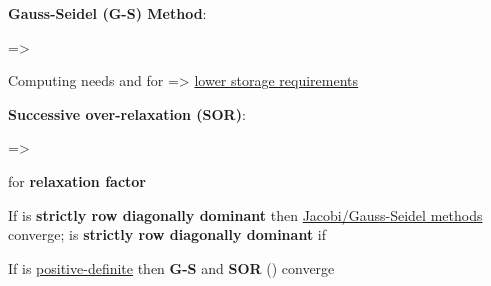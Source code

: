 \hSep %

\textbf{Gauss-Seidel (G-S) Method}:

 => 
\begin{itemize}
      \vItem
      \vItem
            Computing  needs
             and
             for  =>
            \underline{lower storage requirements}
\end{itemize}

\hSep %

\textbf{Successive over-relaxation (SOR)}:

 =>
\begin{itemize}

      \vItem
            for \textbf{relaxation factor} \\
\end{itemize}

\hSep %

If  is \textbf{strictly row diagonally dominant} then \underline{Jacobi/Gauss-Seidel methods} converge;
 is \textbf{strictly row diagonally dominant} if 

If  is \underline{positive-definite} then \textbf{G-S} and \textbf{SOR} () converge

